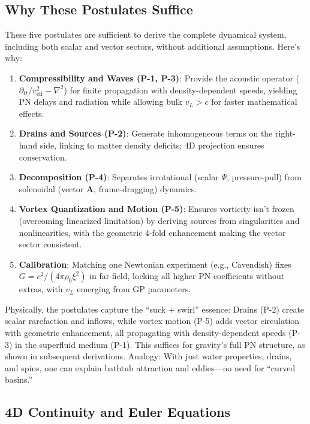 \documentclass{article}
\begin{document}
\subsection{Why These Postulates Suffice}

These five postulates are sufficient to derive the complete dynamical system, including both scalar and vector sectors, without additional assumptions. Here's why:

\begin{enumerate}
    \item \textbf{Compressibility and Waves (P-1, P-3)}: Provide the acoustic operator ($\partial_{tt}/v_{\text{eff}}^2 - \nabla^2$) for finite propagation with density-dependent speeds, yielding PN delays and radiation while allowing bulk $v_L > c$ for faster mathematical effects.
    \item \textbf{Drains and Sources (P-2)}: Generate inhomogeneous terms on the right-hand side, linking to matter density deficits; 4D projection ensures conservation.
    \item \textbf{Decomposition (P-4)}: Separates irrotational (scalar $\Psi$, pressure-pull) from solenoidal (vector $\mathbf{A}$, frame-dragging) dynamics.
    \item \textbf{Vortex Quantization and Motion (P-5)}: Ensures vorticity isn't frozen (overcoming linearized limitation) by deriving sources from singularities and nonlinearities, with the geometric 4-fold enhancement making the vector sector consistent.
    \item \textbf{Calibration}: Matching one Newtonian experiment (e.g., Cavendish) fixes $G = c^2 / (4\pi \rho_0 \xi^2)$ in far-field, locking all higher PN coefficients without extras, with $v_L$ emerging from GP parameters.
\end{enumerate}

Physically, the postulates capture the ``suck + swirl'' essence: Drains (P-2) create scalar rarefaction and inflows, while vortex motion (P-5) adds vector circulation with geometric enhancement, all propagating with density-dependent speeds (P-3) in the superfluid medium (P-1). This suffices for gravity's full PN structure, as shown in subsequent derivations. Analogy: With just water properties, drains, and spins, one can explain bathtub attraction and eddies---no need for ``curved basins.''

\subsection{4D Continuity and Euler Equations}
\end{document}
